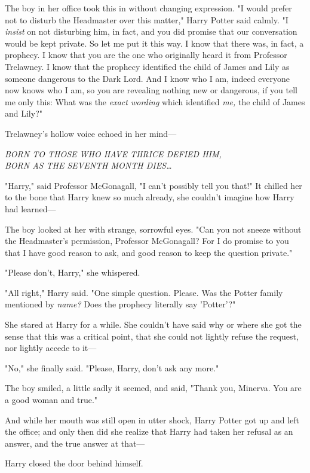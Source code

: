 The boy in her office took this in without changing expression. "I would prefer 
not to disturb the Headmaster over this matter," Harry Potter said calmly. "I 
\emph{insist} on not disturbing him, in fact, and you did promise that our 
conversation would be kept private. So let me put it this way. I know that 
there was, in fact, a prophecy. I know that you are the one who originally 
heard it from Professor Trelawney. I know that the prophecy identified the 
child of James and Lily as someone dangerous to the Dark Lord. And I know who I 
am, indeed everyone now knows who I am, so you are revealing nothing new or 
dangerous, if you tell me only this: What was the \emph{exact wording} which 
identified \emph{me,} the child of James and Lily?"

Trelawney's hollow voice echoed in her mind---

\emph{BORN TO THOSE WHO HAVE THRICE DEFIED HIM,\\
BORN AS THE SEVENTH MONTH DIES{\ldots}}

"Harry," said Professor McGonagall, "I can't possibly tell you that!" It 
chilled her to the bone that Harry knew so much already, she couldn't imagine 
how Harry had learned---

The boy looked at her with strange, sorrowful eyes. "Can you not sneeze without 
the Headmaster's permission, Professor McGonagall? For I do promise to you that 
I have good reason to ask, and good reason to keep the question private."

"Please don't, Harry," she whispered.

"All right," Harry said. "One simple question. Please. Was the Potter family 
mentioned by \emph{name?} Does the prophecy literally say 'Potter'?"

She stared at Harry for a while. She couldn't have said why or where she got 
the sense that this was a critical point, that she could not lightly refuse the 
request, nor lightly accede to it---

"No," she finally said. "Please, Harry, don't ask any more."

The boy smiled, a little sadly it seemed, and said, "Thank you, Minerva. You 
are a good woman and true."

And while her mouth was still open in utter shock, Harry Potter got up and left 
the office; and only then did she realize that Harry had taken her refusal as 
an answer, and the true answer at that---

Harry closed the door behind himself.

